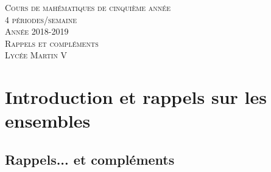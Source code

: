 \documentclass[a4paper,13pt]{scrreprt}
\theoremstyle{plain}
\theoremstyle{definition}
\begin{document}
	
\begin{titlepage}
	
	\newcommand{\HRule}{\rule{\linewidth}{0.5mm}} %
	
	\center %
	
	
	\vspace{4cm}
	
	\textsc{\Large Cours de mahématiques de cinquième année \\ 4 périodes/semaine \\ Année 2018-2019}\\[0.5cm]
	\vspace{9.6cm}
	\textsc{\LARGE Rappels et compléments}\\[1cm] %
	\vspace{10cm}
	\textsc{\Large Lycée Martin V}\\[0.5cm] %
	

	
\end{titlepage}
	

\tableofcontents

\chapter{Introduction et rappels sur les ensembles}

\section{Rappels... et compléments}
\end{document}
